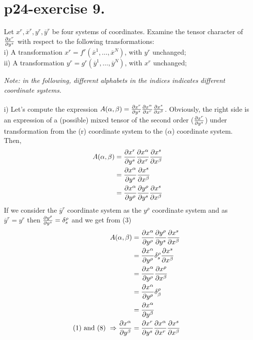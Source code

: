 \section{p24-exercise 9.}
\begin{tcolorbox}
Let $x^r, \overline{x}^r, y^r,\overline{y}^r $ be four systems of coordinates. Examine the tensor character of $\pdv{x^r}{y^s}$ with respect to the following transformations:\\
i) A transformation $x^r = f^r(\overline{x}^1,\dots,\overline{x}^N)$, with $y^r$ unchanged;\\
ii) A transformation $y^r = g^r(\overline{y}^1,\dots,\overline{y}^N)$, with $x^r$ unchanged;
\end{tcolorbox}
\textit{Note: in the following, different alphabets in the indices indicates different coordinate systems.}\\\\
i) Let's compute the expression $A(\alpha, \beta) = \pdv{x^r}{y^s}\pdv{x^{\alpha}}{x^r}\pdv{x^s}{x^{\beta }}$. Obviously, the right side is an expression of a (possible) mixed tensor of the second order ($\pdv{x^r}{y^s}$) under transformation from the (r) coordinate system to the ($\alpha$) coordinate system. Then, 
\begin{align}
\ A(\alpha, \beta) &= \pdv{x^r}{y^s}\pdv{x^{\alpha}}{x^r}\pdv{x^s}{x^{\beta }}\\
&= \pdv{x^{\alpha}}{y^s}\pdv{x^s}{x^{\beta }}\\
&= \pdv{x^{\alpha}}{y^{\rho}}\pdv{y^{\rho }}{y^s}\pdv{x^s}{x^{\beta }}
\end{align}
If we consider the $\overline{y}^r$ coordinate system as the $y^{\rho }$ coordinate system and as $\overline{y}^r = y^r$ then $\pdv{y^{\rho }}{y^s} = \delta^{\rho}_s$ and we get from (3)
\begin{align}
\ A(\alpha, \beta) &= \pdv{x^{\alpha}}{y^{\rho}}\pdv{y^{\rho }}{y^s}\pdv{x^s}{x^{\beta }}\\
\ &= \pdv{x^{\alpha}}{y^{\rho}}\delta^{\rho}_{s}\pdv{x^s}{x^{\beta }}\\
\ &= \pdv{x^{\alpha}}{y^{\rho}}\pdv{x^{\rho}}{x^{\beta }}\\
\ &= \pdv{x^{\alpha}}{y^{\rho}}\delta^{\rho}_{\beta }\\
\ &= \pdv{x^{\alpha}}{y^{\beta}}\\
\text{(1) and (8)   } \Rightarrow \pdv{x^{\alpha}}{y^{\beta}} &= \pdv{x^r}{y^s}\pdv{x^{\alpha}}{x^r}\pdv{x^s}{x^{\beta }}
\end{align}

